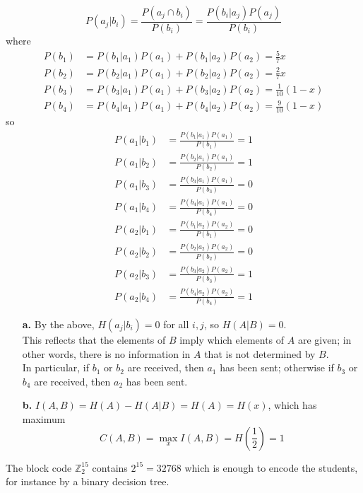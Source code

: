 \documentclass[11pt]{article}
\begin{document}
\quad
\[
  P(a_j|b_i) = \frac{P(a_j\cap b_i)}{P(b_i)}
             = \frac{P(b_i|a_j)P(a_j)}{P(b_i)}
\]
where
\begin{align*}
  P(b_1) &= P(b_1|a_1)P(a_1) + P(b_1|a_2)P(a_2) = \frac{5}{7}x\\
  P(b_2) &= P(b_2|a_1)P(a_1) + P(b_2|a_2)P(a_2) = \frac{2}{7}x\\
  P(b_3) &= P(b_3|a_1)P(a_1) + P(b_3|a_2)P(a_2) = \frac{1}{10}(1-x)\\
  P(b_4) &= P(b_4|a_1)P(a_1) + P(b_4|a_2)P(a_2) = \frac{9}{10}(1-x)
\end{align*}
so
\begin{align*}
  P(a_1|b_1) &= \frac{P(b_1|a_1)P(a_1)}{P(b_1)} = 1\\
  P(a_1|b_2) &= \frac{P(b_2|a_1)P(a_1)}{P(b_2)} = 1\\
  P(a_1|b_3) &= \frac{P(b_3|a_1)P(a_1)}{P(b_3)} = 0\\
  P(a_1|b_4) &= \frac{P(b_4|a_1)P(a_1)}{P(b_4)} = 0\\
  P(a_2|b_1) &= \frac{P(b_1|a_2)P(a_2)}{P(b_1)} = 0\\
  P(a_2|b_2) &= \frac{P(b_2|a_2)P(a_2)}{P(b_2)} = 0\\
  P(a_2|b_3) &= \frac{P(b_3|a_2)P(a_2)}{P(b_3)} = 1\\
  P(a_2|b_4) &= \frac{P(b_4|a_2)P(a_2)}{P(b_4)} = 1
\end{align*}
\begin{itemize}
  \item[{\bf a.}] By the above, $H(a_j|b_i) = 0$ for all $i,j$, so $H(A|B) = 0$.\\
    This reflects that the elements of $B$ imply which elements of $A$ are given;
    in other words, there is no information in $A$ that is not determined by $B$.\\
    In particular, if $b_1$ or $b_2$ are received, then $a_1$ has been sent;
    otherwise if $b_3$ or $b_4$ are received, then $a_2$ has been sent.
  \item[{\bf b.}] $I(A,B) = H(A) - H(A|B) = H(A) = H(x)$, which has maximum
    \[
      C(A,B) = \max_{x} I(A,B) = H(\frac{1}{2}) = 1
    \]
\end{itemize}

\bigskip{}
The block code $\mathbb{Z}_2^{15}$ contains $2^{15} = 32768$
which is enough to encode the students,
for instance by a binary decision tree.
\end{document}
